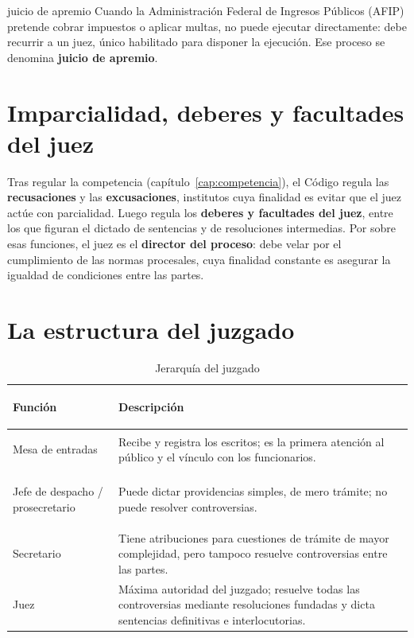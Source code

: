 \documentclass[12pt,oneside]{book}
\begin{document}
\begin{ejemplo}{juicio de apremio}
Cuando la Administración Federal de Ingresos Públicos (AFIP) pretende cobrar impuestos o aplicar multas, no puede ejecutar directamente: debe recurrir a un juez, único habilitado para disponer la ejecución. Ese proceso se denomina \textbf{juicio de apremio}.
\end{ejemplo}

\section{Imparcialidad, deberes y facultades del juez}

Tras regular la competencia (capítulo~\ref{cap:competencia}), el Código regula las \textbf{recusaciones} y las \textbf{excusaciones}, institutos cuya finalidad es evitar que el juez actúe con parcialidad. Luego regula los \textbf{deberes y facultades del juez}, entre los que figuran el dictado de sentencias y de resoluciones intermedias. Por sobre esas funciones, el juez es el \textbf{director del proceso}: debe velar por el cumplimiento de las normas procesales, cuya finalidad constante es asegurar la igualdad de condiciones entre las partes.

\section{La estructura del juzgado}

\begin{table}[H]
\centering
\caption{Jerarquía del juzgado}
\begin{tabularx}{\textwidth}{>{\bfseries\raggedright\arraybackslash}p{} X}
\toprule
Función & Descripción \\
\midrule
Mesa de entradas & Recibe y registra los escritos; es la primera atención al público y el vínculo con los funcionarios. \\
Jefe de despacho / prosecretario & Puede dictar providencias simples, de mero trámite; no puede resolver controversias. \\
Secretario & Tiene atribuciones para cuestiones de trámite de mayor complejidad, pero tampoco resuelve controversias entre las partes. \\
Juez & Máxima autoridad del juzgado; resuelve todas las controversias mediante resoluciones fundadas y dicta sentencias definitivas e interlocutorias. \\
\bottomrule
\end{tabularx}
\end{table}
\end{document}
